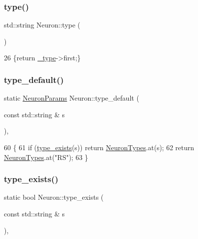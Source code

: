 \subsubsection{\texorpdfstring{type()}{type()}}
{\footnotesize\ttfamily std\+::string Neuron\+::type (\begin{DoxyParamCaption}{ }\end{DoxyParamCaption})\hspace{0.3cm}{\ttfamily [inline]}}


\begin{DoxyCode}
26 \{\textcolor{keywordflow}{return} \hyperlink{classNeuron_af48de7c2ad739fc5d57bfa2f3b1f7663}{\_type}->first;\}
\end{DoxyCode}
\mbox{\label{classNeuron_a4e5c4e0a512460dd59449a0bec4d0db7}} 
\subsubsection{\texorpdfstring{type\+\_\+default()}{type\_default()}}
{\footnotesize\ttfamily static \hyperlink{structNeuronParams}{Neuron\+Params} Neuron\+::type\+\_\+default (\begin{DoxyParamCaption}\item[{const std\+::string \&}]{s }\end{DoxyParamCaption})\hspace{0.3cm}{\ttfamily [inline]}, {\ttfamily [static]}}


\begin{DoxyCode}
60                                                          \{
61         \textcolor{keywordflow}{if} (\hyperlink{classNeuron_a3a80c93e7cf5214b5e1a9925742bbe8e}{type\_exists}(s)) \textcolor{keywordflow}{return} \hyperlink{classNeuron_ab4b47274e756b72923d2f8a9a5037d23}{NeuronTypes}.at(s);
62         \textcolor{keywordflow}{return} \hyperlink{classNeuron_ab4b47274e756b72923d2f8a9a5037d23}{NeuronTypes}.at(\textcolor{stringliteral}{"RS"});
63     \}
\end{DoxyCode}
\mbox{\label{classNeuron_a3a80c93e7cf5214b5e1a9925742bbe8e}} 
\subsubsection{\texorpdfstring{type\+\_\+exists()}{type\_exists()}}
{\footnotesize\ttfamily static bool Neuron\+::type\+\_\+exists (\begin{DoxyParamCaption}\item[{const std\+::string \&}]{s }\end{DoxyParamCaption})\hspace{0.3cm}{\ttfamily [inline]}, {\ttfamily [static]}}


